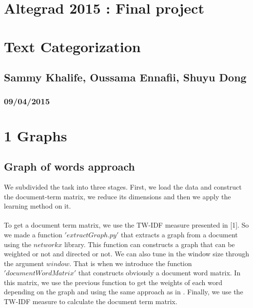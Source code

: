 
\geometry{hmargin=2.5cm,vmargin=2cm}   


\begin{center}

\section*{Altegrad 2015 : Final project}
\section*{Text Categorization}
\subsection*{Sammy Khalife, Oussama Ennafii, Shuyu Dong}
\subsubsection*{09/04/2015}

\end{center}

\section*{1 Graphs}
\subsection*{Graph of words approach}

We subdivided the task into three stages. First, we load the data and construct the document-term matrix, we reduce its dimensions and then we apply the learning method on it.~\\
~\\
To get a document term matrix, we use the TW-IDF measure presented in [1]. So we made a function $'extractGraph.py'$ that extracts a graph from a document using the $networkx$ library. This function can constructs a graph that can be weighted or not and directed or not. We can also tune in the window size through the argument $window$. That is when we introduce the function $'documentWordMatrix'$ that constructs obviously a document word matrix. In this matrix, we use the previous function to get the weights of each word depending on the graph and using the same approach as in \cite{rousseau2013graph}. Finally, we use the TW-IDF measure to calculate the document term matrix.\\

